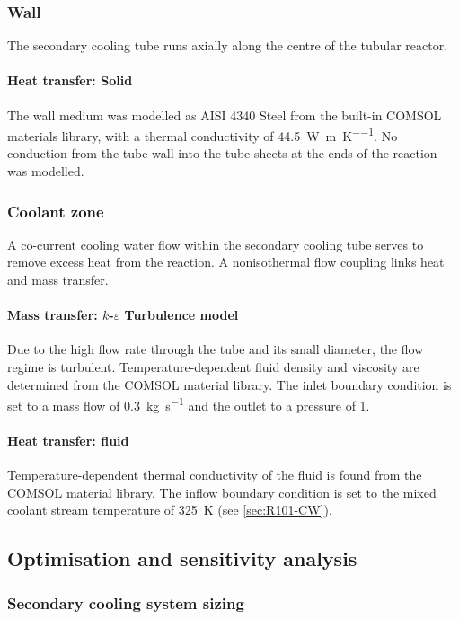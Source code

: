 \subsubsection{Wall}
The secondary cooling tube runs axially along the centre of the tubular reactor.

\paragraph{Heat transfer: Solid}
The wall medium was modelled as AISI 4340 Steel from the built-in COMSOL materials library, with a thermal conductivity of \SI{44.5}{\W\per\m\per\K}. No conduction from the tube wall into the tube sheets at the ends of the reaction was modelled.

\subsubsection{Coolant zone}
A co-current cooling water flow within the secondary cooling tube serves to remove excess heat from the reaction. A nonisothermal flow coupling links heat and mass transfer.

\paragraph{Mass transfer: $k$-$\varepsilon$ Turbulence model}
Due to the high flow rate through the tube and its small diameter, the flow regime is turbulent. Temperature-dependent fluid density and viscosity are determined from the COMSOL material library. The inlet boundary condition is set to a mass flow of \SI{0.3}{\kg\per\s} and the outlet to a pressure of \SI{1}{\atm}.

\paragraph{Heat transfer: fluid}
Temperature-dependent thermal conductivity of the fluid is found from the COMSOL material library. The inflow boundary condition is set to the mixed coolant stream temperature of \SI{325}{\K} (see \cref{sec:R101-CW}).

\subsection{Optimisation and sensitivity analysis}

\subsubsection{Secondary cooling system sizing}

